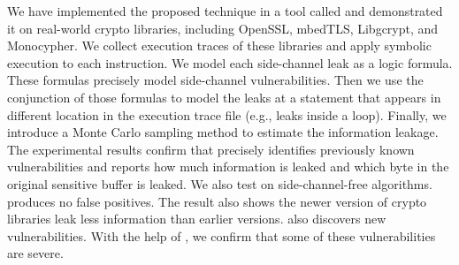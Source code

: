 We have implemented the proposed technique in a tool called \tool{} and demonstrated 
it on real-world crypto libraries, including OpenSSL, 
mbedTLS, Libgcrypt, and Monocypher.
We collect execution traces of these libraries and apply 
symbolic execution to each instruction. We model
each side-channel leak as a logic formula. These
formulas precisely model side-channel vulnerabilities. 
Then we use the conjunction of those formulas to model the 
leaks at a statement that appears in different location in
the execution trace file (e.g., leaks inside a loop).
Finally, we introduce a Monte Carlo sampling method to estimate 
the information leakage. 
The experimental results confirm
that \tool{} precisely identifies previously known vulnerabilities and 
reports how much information is leaked and which byte in the original sensitive 
buffer is leaked. We also test \tool{} on side-channel-free algorithms. 
\tool{} produces no false positives.
The result also shows the newer version of crypto libraries leak less information 
than earlier versions.
\tool{} also discovers new vulnerabilities. With the help of \tool{}, 
we confirm that some of these vulnerabilities are severe.





